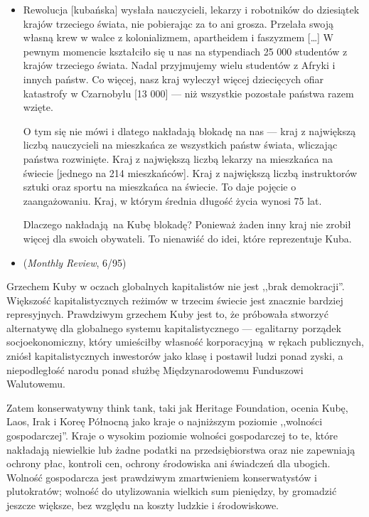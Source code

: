 \documentclass[12pt]{book}
\begin{document}
\begin{itemize}[label=]
  \item \small Rewolucja [kubańska] wysłała nauczycieli, lekarzy i robotników do dziesiątek krajów trzeciego świata, nie pobierając za to ani grosza. Przelała swoją własną krew w walce z kolonializmem, apartheidem i faszyzmem [\ldots] W pewnym momencie kształciło się u nas na stypendiach 25 000 studentów z krajów trzeciego świata. Nadal przyjmujemy wielu studentów z Afryki i innych państw. Co więcej, nasz kraj wyleczył więcej dziecięcych ofiar katastrofy w Czarnobylu [13 000] — niż wszystkie pozostałe państwa razem wzięte.

    O tym się nie mówi i dlatego nakładają blokadę na nas — kraj z największą liczbą nauczycieli na mieszkańca ze wszystkich państw świata, wliczając państwa rozwinięte. Kraj z największą liczbą lekarzy na mieszkańca na świecie [jednego na 214 mieszkańców]. Kraj z największą liczbą instruktorów sztuki oraz sportu na mieszkańca na świecie. To daje pojęcie o zaangażowaniu. Kraj, w którym średnia długość życia wynosi 75 lat.

    Dlaczego nakładają na Kubę blokadę? Ponieważ żaden inny kraj nie zrobił więcej dla swoich obywateli. To nienawiść do idei, które reprezentuje Kuba. 
  \item  (\textit{Monthly Review}, 6/95)
\end{itemize}

Grzechem Kuby w oczach globalnych kapitalistów nie jest ,,brak demokracji''. Większość kapitalistycznych reżimów w trzecim świecie jest znacznie bardziej represyjnych. Prawdziwym grzechem Kuby jest to, że próbowała stworzyć alternatywę dla globalnego systemu kapitalistycznego — egalitarny porządek socjoekonomiczny, który umieściłby własność korporacyjną w rękach publicznych, zniósł kapitalistycznych inwestorów jako klasę i postawił ludzi ponad zyski, a niepodległość narodu ponad służbę Międzynarodowemu Funduszowi Walutowemu.

Zatem konserwatywny think tank, taki jak Heritage Foundation, ocenia Kubę, Laos, Irak i Koreę Północną jako kraje o najniższym poziomie ,,wolności gospodarczej''. Kraje o wysokim poziomie wolności gospodarczej to te, które nakładają niewielkie lub żadne podatki na przedsiębiorstwa oraz nie zapewniają ochrony płac, kontroli cen, ochrony środowiska ani świadczeń dla ubogich. Wolność gospodarcza jest prawdziwym zmartwieniem konserwatystów i plutokratów; wolność do utylizowania wielkich sum pieniędzy, by gromadzić jeszcze większe, bez względu na koszty ludzkie i środowiskowe.
\end{document}

